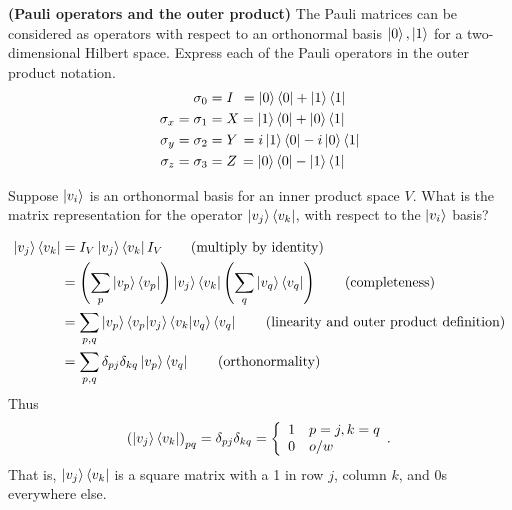  \textbf{(Pauli operators and the outer product)} The Pauli matrices can be considered as operators with respect to an orthonormal basis $\ket{0}, \ket{1}$ for a two-dimensional Hilbert space.  Express each of the Pauli operators in the outer product notation.
\begin{align*}
	\sigma_0 &= I \hspace{4.5pt}= \ket{0}\bra{0} + \ket{1}\bra{1}\\
	\sigma_x = \sigma_1 &= X = \ket{1}\bra{0} + \ket{0}\bra{1}\\
	\sigma_y = \sigma_2 &= Y \hspace{1.5pt}=  i\ket{1}\bra{0} - i\ket{0}\bra{1}\\
	\sigma_z = \sigma_3 &= Z \hspace{1.5pt}= \ket{0}\bra{0} - \ket{1}\bra{1}
\end{align*}


 Suppose $\ket{v_i}$ is an orthonormal basis for an inner product space $V$.  What is the matrix representation for the operator $\ket{v_j}\bra{v_k}$, with respect to the $\ket{v_i}$ basis?
\Soln \begin{comment} Let $\ket{v}=\sum_i a_i\ket{v_i}$ be a vector in $V$. 
\begin{align*}
	(\ket{v_j}\bra{v_k})(\ket{v}) = (\ket{v_j}\bra{v_k})\left(\sum_i a_i\ket{v_i}\right) &= \sum_i\braket{v_k|v_i}\ket{v_j} \tag{definition}\\
	&= \sum_i\delta_{ki}\ket{v_j}
\end{align*}
\end{comment}
\begin{align*}
	\ket{v_j}\bra{v_k} &= I_V \ket{v_j} \bra{v_k} I_V \tag{multiply by identity}\\
	&= \left(\sum_p \ket{v_p}\bra{v_p} \right) \ket{v_j}\bra{v_k} \left(\sum_q \ket{v_q}\bra{v_q} \right) \tag{completeness}\\
	&= \sum_{p,q} \ket{v_p} \braket{v_p|v_j}\braket{v_k | v_q} \bra{v_q} \tag{linearity and outer product definition}\\
	&= \sum_{p,q} \delta_{pj} \delta_{kq} \ket{v_p} \bra{v_q} \tag{orthonormality}
\end{align*}
Thus
\begin{align*}
	\left( \ket{v_j}\bra{v_k} \right)_{pq} = \delta_{pj} \delta_{kq} = \left\{\begin{array}{ll}1 & p=j, k=q \\ 0 & o/w\end{array}.\right. 
\end{align*}
That is, $\ket{v_j}\bra{v_k}$ is a square matrix with a 1 in row $j$,  column $k$, and 0s everywhere else.

